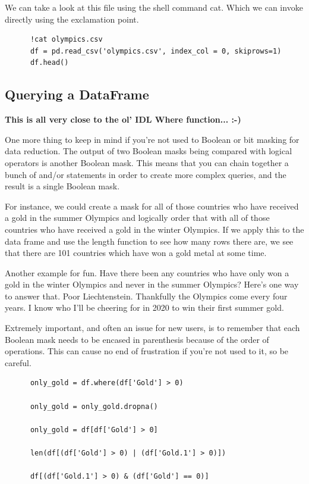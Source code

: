 \documentclass[11pt]{article}
\begin{document}
    \smallskip     \smallskip     \noindent
    We can take a look at this file using the shell command cat. Which
    we can invoke directly using the exclamation point.
    \begin{lstlisting}
      !cat olympics.csv
      df = pd.read_csv('olympics.csv', index_col = 0, skiprows=1)
      df.head()
    \end{lstlisting}


    \subsection{Querying a DataFrame}
    \smallskip     \smallskip     \noindent
    {\bf This is all very close to the ol' IDL Where function...  :-) }
    
    \smallskip     \smallskip     \noindent
    One more thing to keep in mind if you're not used to Boolean or
    bit masking for data reduction. The output of two Boolean masks being
    compared with logical operators is another Boolean mask. This means
    that you can chain together a bunch of and/or statements in order to
    create more complex queries, and the result is a single Boolean mask. 

    For instance, we could create a mask for all of those countries
    who have received a gold in the summer Olympics and logically order
    that with all of those countries who have received a gold in the
    winter Olympics. If we apply this to the data frame and use the length
    function to see how many rows there are, we see that there are 101
    countries which have won a gold metal at some time.
    
    Another example for fun. Have there been any countries who have
    only won a gold in the winter Olympics and never in the summer
    Olympics? Here's one way to answer that.  Poor
    Liechtenstein. Thankfully the Olympics come every four years. I know
    who I'll be cheering for in 2020 to win their first summer gold.
    
    Extremely important, and often an issue for new users, is to remember
    that each Boolean mask needs to be encased in parenthesis because of
    the order of operations. This can cause no end of frustration if
    you're not used to it, so be careful.
    \begin{lstlisting}
      only_gold = df.where(df['Gold'] > 0)
      
      only_gold = only_gold.dropna()
      
      only_gold = df[df['Gold'] > 0]
      
      len(df[(df['Gold'] > 0) | (df['Gold.1'] > 0)])
      
      df[(df['Gold.1'] > 0) & (df['Gold'] == 0)]
    \end{lstlisting}
\end{document}
